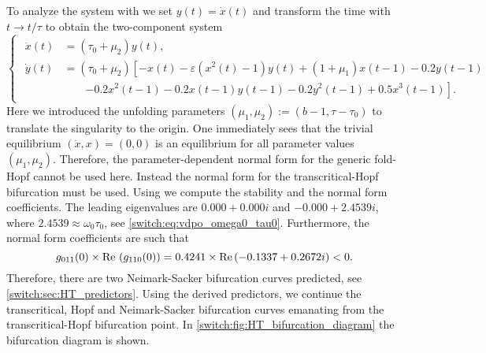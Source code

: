 \begin{subappendices}
To analyze the system with \DDEBIFTOOL we set $y(t)=\dot{x}(t)$ and transform the time with $t\rightarrow t/\tau$ to obtain the two-component system
\begin{equation}
\begin{cases}
\begin{aligned}
\dot{x}(t)&=\left(\tau_0+\mu_2\right)y(t),\\[0.5em]
\dot{y}(t)&=\left(\tau_0+\mu_{2}\right)\left[-x(t)-\varepsilon(x^2(t)-1)y(t)+(1+\mu_1)x(t-1)-0.2y(t-1) \right. \\[0.5em]
&\qquad \left. -0.2x^2(t-1)-0.2x(t-1)y(t-1)-0.2y^2(t-1)+0.5x^3(t-1)\right].
\end{aligned}
\end{cases}\label{switch:eq:vdp}
\end{equation}
Here we introduced the unfolding parameters $(\mu_1,\mu_{2}):=(b-1,\tau-\tau_{0})$ to translate the singularity to the origin. One immediately sees that the trivial equilibrium $(\dot{x},x)=(0,0)$ is an equilibrium for all parameter values $(\mu_{1},\mu_{2})$. Therefore, the parameter-dependent normal form for the generic fold-Hopf cannot be used here. Instead the normal form for the transcritical-Hopf bifurcation must be used. Using \DDEBIFTOOL we compute the stability and the normal form coefficients. The leading eigenvalues are $0.000+0.000i$ and $-0.000+2.4539i$, where $2.4539\approx\omega_{0}\tau_{0}$, see \cref{switch:eq:vdpo_omega0_tau0}. Furthermore, the normal form coefficients are such that
\[
g_{011}(0)\times\text{Re\,}\left(g_{110}(0)\right)=0.4241\times \Re\left(-0.1337+0.2672i\right)<0.
\]
Therefore, there are two Neimark-Sacker bifurcation curves predicted, see \cref{switch:sec:HT_predictors}. Using the derived predictors, we continue the transcritical, Hopf and Neimark-Sacker bifurcation curves emanating from the transcritical-Hopf bifurcation point. In \cref{switch:fig:HT_bifurcation_diagram} the bifurcation diagram is shown.
\end{subappendices}
